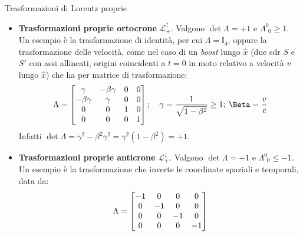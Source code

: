 \documentclass[a4_2,grid,frame]{flashcards}
\newenvironment{cartaflash}
    {\vspace{-15pt}
    \begin{itemize}
    }
    {
    \end{itemize}
    }
\begin{document}
\begin{flashcard}[Proprietà]{Trasformazioni di Lorentz proprie}
\begin{cartaflash}
\item \textbf{Trasformazioni proprie ortocrone} $\mathcal{L}_+^\uparrow$. Valgono $\operatorname{det}\Lambda = +1$ e $\Lambda_{\>\>0}^0 \geq 1$. Un esempio è la trasformazione di identità, per cui $\Lambda = \mathbb{I}_4$, oppure la trasformazione delle velocità, come nel caso di un \textit{boost} lungo $\hat{x}$ (due sdr $S$ e $S'$ con assi allineati, origini coincidenti a $t=0$ in moto relativo a velocità $v$ lungo $\hat{x}$) che ha per matrice di trasformazione:
\vspace{-7pt}
\[
\Lambda = \begin{bmatrix}\gamma & -\beta\gamma & 0 & 0\\
-\beta\gamma & \gamma & 0 & 0\\
0 & 0 & 1 & 0\\
0 & 0 & 0 & 1
\end{bmatrix}; \quad \gamma = \frac{1}{\sqrt{1-\beta^2}} \geq 1; \> \Beta = \frac{v}{c}
\vspace{-7pt}
\]
Infatti $\operatorname{det}\Lambda = \gamma^2-\beta^2\gamma^2 = \gamma^2(1-\beta^2) = +1$.
\item \textbf{Trasformazioni proprie anticrone} $\mathcal{L}_+^\downarrow$. Valgono $\operatorname{det}\Lambda = +1$ e $\Lambda_{\>\>0}^0 \leq -1$. Un esempio è la trasformazione che inverte le coordinate spaziali e temporali, data da:
\vspace{-7pt}
\[
\Lambda = \begin{bmatrix}-1 & 0 & 0 & 0\\
0 & -1 & 0 & 0\\
0 & 0 & -1 & 0\\
0 & 0 & 0 & -1
\end{bmatrix}
\vspace{-10pt}
\]

\end{cartaflash}
\end{flashcard}
\end{document}
